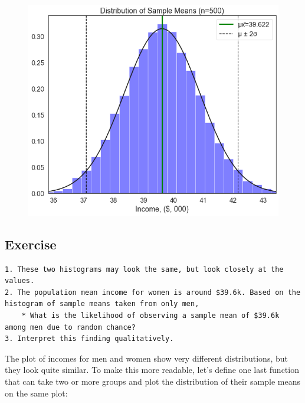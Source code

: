 \documentclass[
  letterpaper,
  DIV=11,
  numbers=noendperiod]{scrreprt}
\begin{document}
\begin{figure}[H]

{\centering \includegraphics{notebooks/W05. Distributions and Basic Statistics_files/figure-pdf/cell-27-output-2.png}

}

\end{figure}

\hypertarget{exercise-16}{%
\subsection{Exercise}\label{exercise-16}}

\begin{verbatim}
1. These two histograms may look the same, but look closely at the values. 
2. The population mean income for women is around $39.6k. Based on the histogram of sample means taken from only men, 
    * What is the likelihood of observing a sample mean of $39.6k among men due to random chance?
3. Interpret this finding qualitatively.
\end{verbatim}

The plot of incomes for men and women show very different distributions,
but they look quite similar. To make this more readable, let's define
one last function that can take two or more groups and plot the
distribution of their sample means on the same plot:
\end{document}
